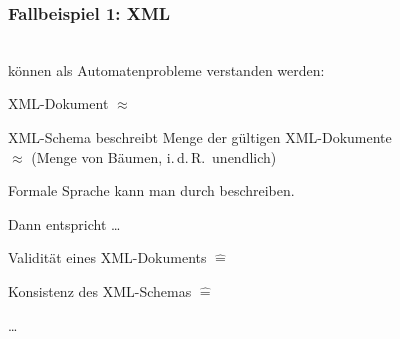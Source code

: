     \begin{frame}
      \frametitle{Fallbeispiel 1: XML}
      
       \\
      können als Automatenprobleme verstanden werden:
      
      \begin{Itemize}
        \item
          XML-Dokument $\approx$ 
        \item
          XML-Schema beschreibt Menge der gültigen XML-Dokumente \\
          $\approx$  (Menge von Bäumen, i.\,d.\,R.\ unendlich)
        \item
          Formale Sprache kann man durch  beschreiben.
      \end{Itemize}
    
      \par\medskip
      Dann entspricht \dots
      
      \begin{Itemize}
        \item
          Validität eines XML-Dokuments $\hat=$ 
        \item
          Konsistenz des XML-Schemas $\hat=$ 
        \item
          \dots
      \end{Itemize}
    
    \end{frame}

